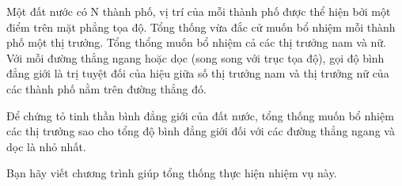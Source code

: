 Một đất nước có N thành phố, vị trí của mỗi thành phố được thể hiện bởi một điểm trên mặt phẳng tọa độ. Tổng thống vừa đắc cử muốn bổ nhiệm mỗi thành phố một thị trưởng. Tổng thổng muốn bổ nhiệm cả các thị trưởng nam và nữ. Với mỗi đường thẳng ngang hoặc dọc (song song với trục tọa độ), gọi độ bình đẳng giới là trị tuyệt đối của hiệu giữa số thị trưởng nam và thị trưởng nữ của các thành phố nằm trên đường thẳng đó.

Để chứng tỏ tinh thần bình đẳng giới của đất nước, tổng thống muốn bổ nhiệm các thị trưởng sao cho tổng độ bình đẳng giới đối với các đường thẳng ngang và dọc là nhỏ nhất.

Bạn hãy viết chương trình giúp tổng thống thực hiện nhiệm vụ này.